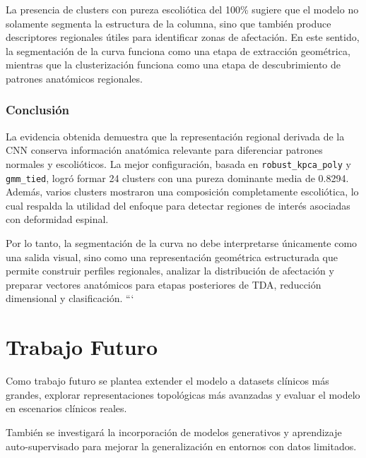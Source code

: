\documentclass[conference]{IEEEtran}
\begin{document}
La presencia de clusters con pureza escoliótica del 100\% sugiere que el modelo no solamente segmenta la estructura de la columna, sino que también produce descriptores regionales útiles para identificar zonas de afectación. En este sentido, la segmentación de la curva funciona como una etapa de extracción geométrica, mientras que la clusterización funciona como una etapa de descubrimiento de patrones anatómicos regionales.

\subsubsection{Conclusión}

La evidencia obtenida demuestra que la representación regional derivada de la CNN conserva información anatómica relevante para diferenciar patrones normales y escolióticos. La mejor configuración, basada en \texttt{robust\_kpca\_poly} y \texttt{gmm\_tied}, logró formar 24 clusters con una pureza dominante media de 0.8294. Además, varios clusters mostraron una composición completamente escoliótica, lo cual respalda la utilidad del enfoque para detectar regiones de interés asociadas con deformidad espinal.

Por lo tanto, la segmentación de la curva no debe interpretarse únicamente como una salida visual, sino como una representación geométrica estructurada que permite construir perfiles regionales, analizar la distribución de afectación y preparar vectores anatómicos para etapas posteriores de TDA, reducción dimensional y clasificación.
```

\section{Trabajo Futuro}

Como trabajo futuro se plantea extender el modelo a datasets clínicos más grandes, explorar representaciones topológicas más avanzadas y evaluar el modelo en escenarios clínicos reales.

También se investigará la incorporación de modelos generativos y aprendizaje auto-supervisado para mejorar la generalización en entornos con datos limitados.
\nocite{*}


\end{document}
